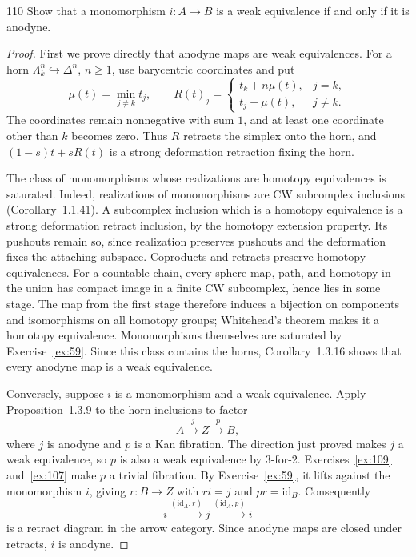 \begin{exercise}{110}
Show that a monomorphism $i\colon A\to B$ is a weak equivalence if and only if it
is anodyne.

\begin{proof}
First we prove directly that anodyne maps are weak equivalences.
For a horn $\Lambda^n_k\hookrightarrow\Delta^n$, $n\ge1$, use barycentric
coordinates and put
\[
 \mu(t)=\min_{j\ne k}t_j,\qquad
 R(t)_j=
 \begin{cases}
  t_k+n\mu(t),&j=k,\\
  t_j-\mu(t),&j\ne k.
 \end{cases}
\]
The coordinates remain nonnegative with sum $1$, and at least one
coordinate other than $k$ becomes zero.
Thus $R$ retracts the simplex onto the horn, and
$(1-s)t+sR(t)$ is a strong deformation retraction fixing the horn.

The class of monomorphisms whose realizations are homotopy equivalences
is saturated. Indeed, realizations of monomorphisms are CW subcomplex
inclusions (Corollary~1.1.41).
A subcomplex inclusion which is a homotopy equivalence is a strong
deformation retract inclusion, by the homotopy extension property.
Its pushouts remain so, since realization preserves pushouts and the
deformation fixes the attaching subspace.
Coproducts and retracts preserve homotopy equivalences.
For a countable chain, every sphere map, path, and homotopy in the
union has compact image in a finite CW subcomplex, hence lies in
some stage. The map from the first stage therefore induces a
bijection on components and isomorphisms on all homotopy groups;
Whitehead's theorem makes it a homotopy equivalence.
Monomorphisms themselves are saturated by Exercise~\ref{ex:59}.
Since this class contains the horns, Corollary~1.3.16 shows that every
anodyne map is a weak equivalence.

Conversely, suppose $i$ is a monomorphism and a weak equivalence.
Apply Proposition~1.3.9 to the horn inclusions to factor
\[
 A\xrightarrow{j}Z\xrightarrow{p}B,
\]
where $j$ is anodyne and $p$ is a Kan fibration.
The direction just proved makes $j$ a weak equivalence, so $p$ is
also a weak equivalence by 3-for-2.
Exercises~\ref{ex:109} and~\ref{ex:107} make $p$ a trivial fibration.
By Exercise~\ref{ex:59}, it lifts against the monomorphism $i$,
giving $r\colon B\to Z$ with $ri=j$ and $pr=\mathrm{id}_B$.
Consequently
\[
 i\xrightarrow{(\mathrm{id}_A,r)}j
  \xrightarrow{(\mathrm{id}_A,p)}i
\]
is a retract diagram in the arrow category.
Since anodyne maps are closed under retracts, $i$ is anodyne.
\end{proof}
\end{exercise}
